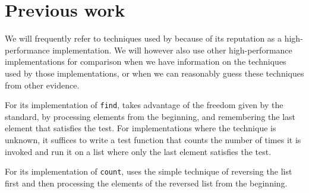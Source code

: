 \section{Previous work}

We will frequently refer to techniques used by \sbcl{} because of its
reputation as a high-performance implementation.  We will however also
use other high-performance implementations for comparison when we have
information on the techniques used by those implementations, or when
we can reasonably guess these techniques from other evidence.

For its implementation of \texttt{find}, \sbcl{} takes advantage of
the freedom given by the standard, by processing elements from the
beginning, and remembering the last element that satisfies the test.
For implementations where the technique is unknown, it suffices to
write a test function that counts the number of times it is invoked
and run it on a list where only the last element satisfies the test.

For its implementation of \texttt{count}, \sbcl{} uses the simple
technique of reversing the list first and then processing the elements
of the reversed list from the beginning.

